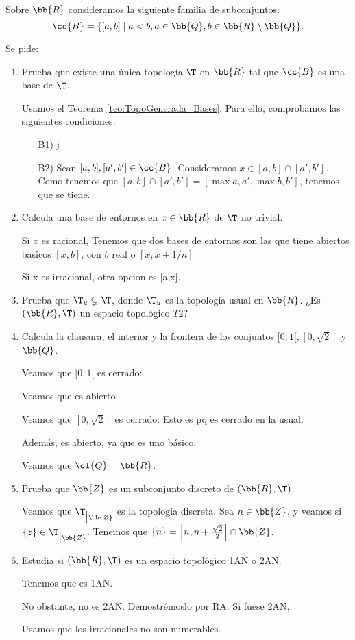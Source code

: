 \begin{ejercicio}
    Sobre $\bb{R}$ consideramos la siguiente familia de subconjuntos:
    \begin{equation*}
        \cc{B}=\{[a,b]\mid a<b,a\in \bb{Q}, b\in \bb{R}\setminus \bb{Q}\}.
    \end{equation*}

    Se pide:
    \begin{enumerate}[label=\alph*)]
        \item Prueba que existe una única topología $\T$ en $\bb{R}$ tal que $\cc{B}$ es una base de $\T$.

        Usamos el Teorema \ref{teo:TopoGenerada_Bases}. Para ello, comprobamos las siguientes condiciones:
        \begin{enumerate}
            \item[B1)] j
            \item[B2)] Sean $[a,b], [a',b']\in \cc{B}$. Consideramos $x\in [a,b]\cap [a',b']$. Como tenemos que $[a,b]\cap [a',b']=[\max{a,a'},\max{b,b'}]$, tenemos que se tiene.
        \end{enumerate}

        \item Calcula una base de entornos en $x\in \bb{R}$ de $\T$ no trivial.

        Si $x$ es racional, Tenemos que dos bases de entornos son las que tiene abiertos basicos $[x,b]$, con $b$ real o $[x,x+1/n]$

        Si x es irracional, otra opcion es [a,x].

        \item Prueba que $\T_u\subsetneq \T$, donde $\T_u$ es la topología usual en $\bb{R}$. ¿Es $(\bb{R},\T)$ un espacio topológico $T2$?

        \item Calcula la clausura, el interior y la frontera de los conjuntos $[0,1[, [0,\sqrt{2}]$ y $\bb{Q}$.

        Veamos que $[0,1[$ es cerrado:

        Veamos que es abierto:


        Veamos que $[0,\sqrt{2}]$ es cerrado: Esto es pq es cerrado en la usual.

        Además, es abierto, ya que es uno básico.

        Veamos que $\ol{Q}=\bb{R}$.

        \item Prueba que $\bb{Z}$ es un subconjunto discreto de $(\bb{R},\T)$.

        Veamos que $\T_{\big| \bb{Z}}$ es la topología discreta. Sea $n\in \bb{Z}$, y veamos si $\{z\}\in \T_{\big| \bb{Z}}$. Tenemos que $\{n\}=\left[n,n+\frac{\sqrt{2}}{2}\right]\cap \bb{Z}$.

        \item Estudia si $(\bb{R}, \T)$ es un espacio topológico 1AN o 2AN.

        Tenemos que es 1AN.
        
        No obstante, no es 2AN. Demostrémoslo por RA. Si fuese 2AN, 

        Usamos que los irracionales no son numerables.
    \end{enumerate}
\end{ejercicio}